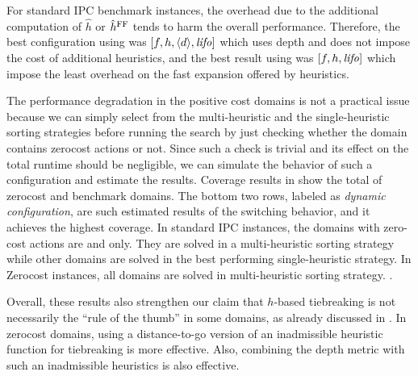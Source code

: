 For standard IPC benchmark instances, the overhead due to the additional computation of
$\hat{h}$ or $\hat{h}^{\text{FF}}$ tends to harm the overall performance.
Therefore, the best configuration using \lmcut was
$[f,h,{\left<d\right>},{\text{\textit{lifo}}}]$ which uses depth and does not impose the cost of
additional heuristics, and the best result using \mands
was $[f,h,{\text{\textit{lifo}}}]$ which impose the least overhead on the fast expansion offered by
\mands heuristics.

The performance degradation in the positive cost domains is not a practical issue
because we can simply select from the multi-heuristic and the single-heuristic sorting strategies
before running the search by just checking whether the domain contains zerocost actions or not.
Since such a check is trivial and its effect on the total runtime should be negligible,
we can simulate the behavior of such a configuration and estimate the results.
Coverage results in  show the total of
zerocost and benchmark domains. The bottom two rows, labeled as \emph{dynamic configuration},
are such estimated results of the switching behavior, and it achieves the highest coverage.
In standard IPC instances, the domains with zero-cost actions are  and  only. They are solved in a multi-heuristic sorting strategy while other domains are solved in the best performing single-heuristic strategy. In Zerocost instances, all domains are solved in multi-heuristic sorting strategy.
.


Overall, these results also strengthen our claim that $h$-based
tiebreaking is not necessarily the ``rule of the thumb'' in some
domains, as already discussed in . In zerocost domains,
using a distance-to-go version of an inadmissible heuristic function for
tiebreaking is more effective. Also, combining the depth metric with
such an inadmissible heuristics is also effective.


